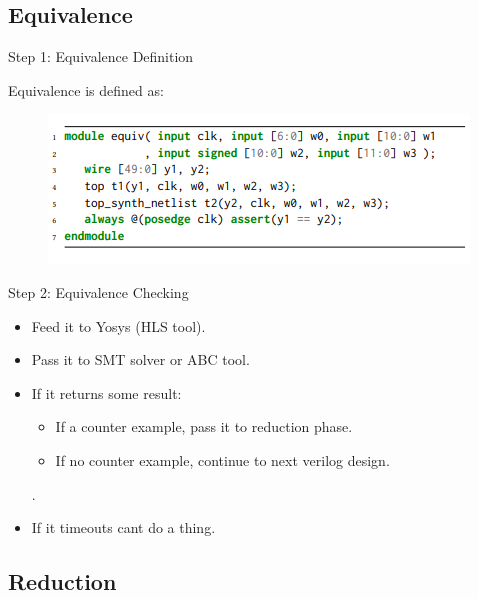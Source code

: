 \documentclass[xcolor=dvipsnames]{beamer}
\begin{document}
    \subsection{Equivalence}
    \begin{frame}{Step 1: Equivalence Definition}

        Equivalence is defined as:

        \begin{figure}
            \includegraphics{Equivalence_Code.PNG}
        \end{figure}

    \end{frame}

    \begin{frame}{Step 2: Equivalence Checking}

        \begin{itemize} 
            \item Feed it to Yosys (HLS tool).
            \item Pass it to SMT solver or ABC tool. 
            \item If it returns some result:
                \begin{itemize}
                    \item If a counter example, pass it to reduction phase.
                    \item If no counter example, continue to next verilog design.
                \end{itemize}.
            \item If it timeouts cant do a thing.
        \end{itemize}

    \end{frame}
    

    \subsection{Reduction}
    
\end{document}
